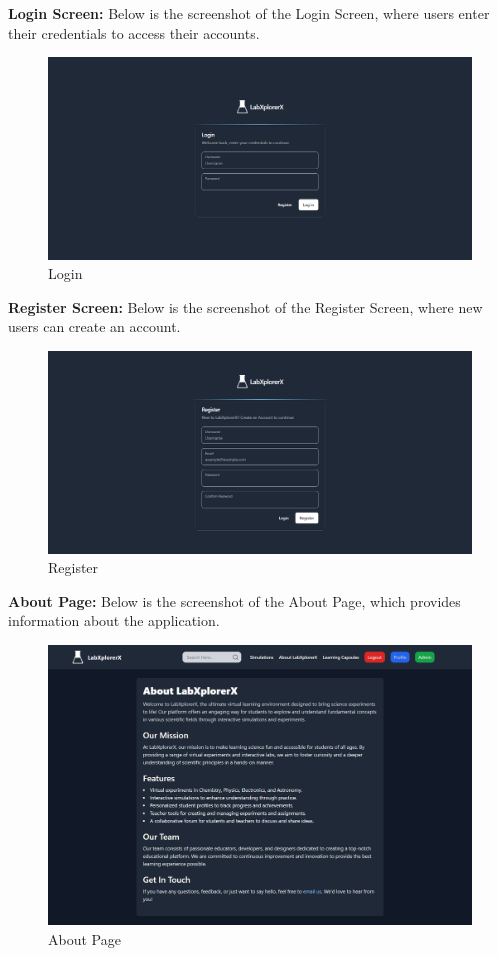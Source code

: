 \textbf{Login Screen:} Below is the screenshot of the Login Screen, where users enter their credentials to access their accounts.
\begin{figure}[H]
    \centering
    \includegraphics[width = 15cm]{Diagrams/output/login.png}
    \caption{Login}
\end{figure}

\textbf{Register Screen:} Below is the screenshot of the Register Screen, where new users can create an account.
\begin{figure}[H]
    \centering
    \includegraphics[width = 16cm]{Diagrams/output/register.png}
    \caption{Register}
\end{figure}

\textbf{About Page:} Below is the screenshot of the About Page, which provides information about the application.
\begin{figure}[H]
    \centering
    \includegraphics[width = 16cm]{Diagrams/output/about.png}
    \caption{About Page}
\end{figure}
\newpage

